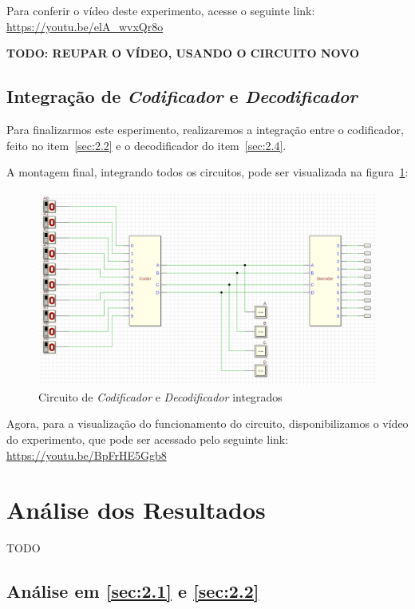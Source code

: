 \documentclass[12pt]{article}
\begin{document}
Para conferir o vídeo deste experimento, acesse o seguinte link:
\href{https://youtu.be/elA_wvxQr8o}{https://youtu.be/elA_wvxQr8o}

\textbf{TODO: REUPAR O VÍDEO, USANDO O CIRCUITO NOVO}

\subsection{Integração de \emph{Codificador} e \emph{Decodificador}}\label{sec:2.5}

Para finalizarmos este esperimento, realizaremos a integração entre o
codificador, feito no item~\ref{sec:2.2} e o decodificador do
item~\ref{sec:2.4}.

A montagem final, integrando todos os circuitos, pode ser visualizada na
figura~\ref{fig:Exp5__2_5_circuit.png}:

\begin{figure}[htp]
    \centering
    \includegraphics[width=12cm]{Exp05/Exp5__2_5_circuit.png}
    \caption{Circuito de \emph{Codificador} e \emph{Decodificador} integrados}
    \label{fig:Exp5__2_5_circuit.png}
\end{figure}

Agora, para a visualização do funcionamento do circuito, disponibilizamos o
vídeo do experimento, que pode ser acessado pelo seguinte link:
\href{https://youtu.be/BpFrHE5Ggb8}{https://youtu.be/BpFrHE5Ggb8}

\section{Análise dos Resultados}
\label{sec:resultados}
TODO

\subsection{Análise em \ref{sec:2.1} e \ref{sec:2.2}}\label{sec:analise2.1}
\end{document}
